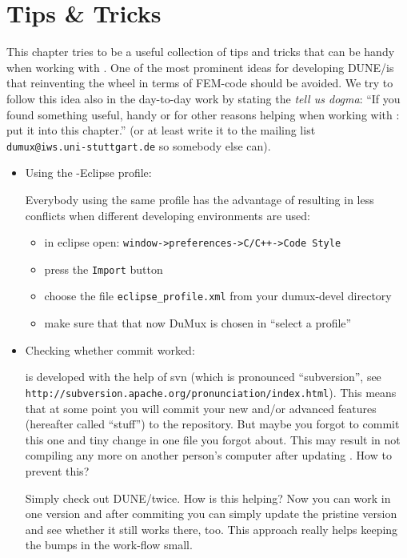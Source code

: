 \chapter{Tips \& Tricks}
This chapter tries to be a useful collection of tips and tricks that can be handy when working with 
\Dumux. One of the most prominent ideas for developing DUNE/\Dumux is that reinventing the wheel in terms of FEM-code should
be avoided.  We try to follow this idea also in the day-to-day work by stating the \emph{tell us dogma}: ``If you found something useful, 
handy or for other reasons helping when working with \Dumux: put it into this chapter.'' (or at least write it to the mailing list \\ \verb+dumux@iws.uni-stuttgart.de+ so somebody else can). 
\begin{itemize}
 \item Using the \Dumux-Eclipse profile:

Everybody using the same profile has the advantage of  resulting in less conflicts when different developing environments are used:
\begin{itemize}
 \item in eclipse open: \verb#window->preferences->C/C++->Code Style#
  \item press the \verb+Import+ button
  \item choose the file \verb+eclipse_profile.xml+ from your dumux-devel directory
  \item make sure that that now DuMux is chosen in ``select a profile''
\end{itemize}

\item Checking whether commit worked:

\Dumux is developed with the help of svn (which is pronounced ``subversion'', see \\\verb+http://subversion.apache.org/pronunciation/index.html+). This means that at some point you will commit your new 
and/or advanced features (hereafter called ``stuff'') to the repository. But maybe you forgot to commit this one and tiny change in one file you forgot about. 
This may result in \Dumux not compiling any more on another person's computer after updating . How to prevent this?

Simply check out DUNE/\Dumux twice. How is this helping? Now you can work in one version and after commiting you can simply update the pristine version and see whether it still works there, too. 
This approach really helps keeping the bumps in the work-flow small.


\end{itemize}
